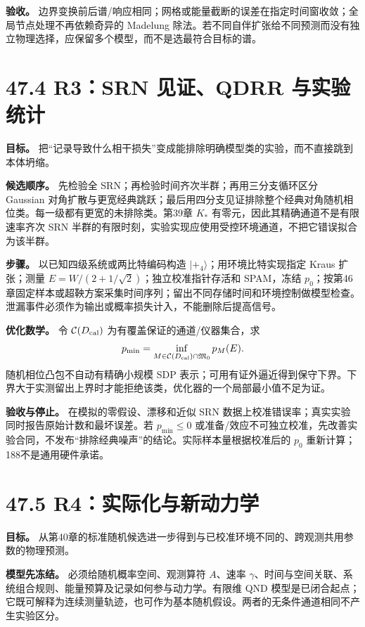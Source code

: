 \documentclass[
  11pt,
  oneside]{book}
\begin{document}
\textbf{验收。}
边界变换前后谱/响应相同；网格或能量截断的误差在指定时间窗收敛；全局节点处理不再依赖奇异的
Madelung
除法。若不同自伴扩张给不同预测而没有独立物理选择，应保留多个模型，而不是选最符合目标的谱。

\section{47.4 R3：SRN 见证、QDRR 与实验统计}

\textbf{目标。}
把``记录导致什么相干损失''变成能排除明确模型类的实验，而不直接跳到本体坍缩。

\textbf{候选顺序。} 先检验全 SRN；再检验时间齐次半群；再用三分支循环区分
Gaussian
对角扩散与更宽经典跳跃；最后用四分支见证排除整个经典对角随机相位类。每一级都有更宽的未排除类。第39章
\(K_*\) 有零元，因此其精确通道不是有限速率齐次 SRN
半群的有限时刻，实验实现应使用受控环境通道，不把它错误拟合为该半群。

\textbf{步骤。} 以已知四级系统或两比特编码构造
\(|+_4\rangle\)；用环境比特实现指定 Kraus 扩张；测量
\(E=W/(2+1/\sqrt2)\)；独立校准指针存活和 SPAM，冻结
\(p_0\)；按第46章固定样本或超鞅方案采集时间序列；留出不同存储时间和环境控制做模型检查。泄漏事件必须作为输出或概率损失计入，不能删除后提高信号。

\textbf{优化数学。} 令 \(\mathcal C(D_{\rm cal})\)
为有覆盖保证的通道/仪器集合，求 \[
p_{\min}=\inf_{M\in\mathcal C(D_{\rm cal})\cap\mathfrak M_0}p_M(E).
\] 随机相位凸包不自动有精确小规模 SDP
表示；可用有证外逼近得到保守下界。下界大于实测留出上界时才能拒绝该类，优化器的一个局部最小值不足为证。

\textbf{验收与停止。} 在模拟的零假设、漂移和近似 SRN
数据上校准错误率；真实实验同时报告原始计数和最坏误差。若
\(p_{\min}\le0\)
或准备/效应不可独立校准，先改善实验合同，不发布``排除经典噪声''的结论。实际样本量根据校准后的
\(p_0\) 重新计算；188不是通用硬件承诺。

\section{47.5 R4：实际化与新动力学}

\textbf{目标。}
从第40章的标准随机候选进一步得到与已校准环境不同的、跨观测共用参数的物理预测。

\textbf{模型先冻结。} 必须给随机概率空间、观测算符 \(A\)、速率
\(\gamma\)、时间与空间关联、系统组合规则、能量预算及记录如何参与动力学。有限维
QND
模型是已闭合起点；它既可解释为连续测量轨迹，也可作为基本随机假设。两者的无条件通道相同不产生实验区分。
\end{document}
